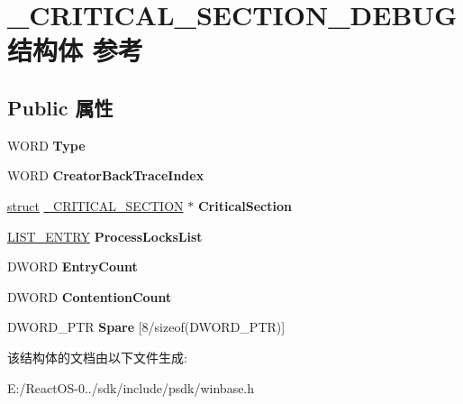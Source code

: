 \hypertarget{struct___c_r_i_t_i_c_a_l___s_e_c_t_i_o_n___d_e_b_u_g}{}\section{\+\_\+\+C\+R\+I\+T\+I\+C\+A\+L\+\_\+\+S\+E\+C\+T\+I\+O\+N\+\_\+\+D\+E\+B\+U\+G结构体 参考}
\label{struct___c_r_i_t_i_c_a_l___s_e_c_t_i_o_n___d_e_b_u_g}
\subsection*{Public 属性}
\begin{DoxyCompactItemize}
\item 
\mbox{\label{struct___c_r_i_t_i_c_a_l___s_e_c_t_i_o_n___d_e_b_u_g_a53e9609e0dec16b27fe9f44c6d459b23}} 
W\+O\+RD {\bfseries Type}
\item 
\mbox{\label{struct___c_r_i_t_i_c_a_l___s_e_c_t_i_o_n___d_e_b_u_g_a7f074c825544e5475d18945618075313}} 
W\+O\+RD {\bfseries Creator\+Back\+Trace\+Index}
\item 
\mbox{\label{struct___c_r_i_t_i_c_a_l___s_e_c_t_i_o_n___d_e_b_u_g_aaa16657ed9ce6f8bab13669af5463d73}} 
\hyperlink{interfacestruct}{struct} \hyperlink{struct___c_r_i_t_i_c_a_l___s_e_c_t_i_o_n}{\+\_\+\+C\+R\+I\+T\+I\+C\+A\+L\+\_\+\+S\+E\+C\+T\+I\+ON} $\ast$ {\bfseries Critical\+Section}
\item 
\mbox{\label{struct___c_r_i_t_i_c_a_l___s_e_c_t_i_o_n___d_e_b_u_g_ac3f8c4d5aa5c6a3505303a703b6ee796}} 
\hyperlink{struct___l_i_s_t___e_n_t_r_y}{L\+I\+S\+T\+\_\+\+E\+N\+T\+RY} {\bfseries Process\+Locks\+List}
\item 
\mbox{\label{struct___c_r_i_t_i_c_a_l___s_e_c_t_i_o_n___d_e_b_u_g_a87712bec7972da4c4e8720fd5402fd0d}} 
D\+W\+O\+RD {\bfseries Entry\+Count}
\item 
\mbox{\label{struct___c_r_i_t_i_c_a_l___s_e_c_t_i_o_n___d_e_b_u_g_a7dea1a79cc8fafce1b2f5b8ca8a9f0f7}} 
D\+W\+O\+RD {\bfseries Contention\+Count}
\item 
\mbox{\label{struct___c_r_i_t_i_c_a_l___s_e_c_t_i_o_n___d_e_b_u_g_ab5c61e89eb213a7ae501dacb74266f30}} 
D\+W\+O\+R\+D\+\_\+\+P\+TR {\bfseries Spare} \mbox{[}8/sizeof(D\+W\+O\+R\+D\+\_\+\+P\+TR)\mbox{]}
\end{DoxyCompactItemize}


该结构体的文档由以下文件生成\+:\begin{DoxyCompactItemize}
\item 
E\+:/\+React\+O\+S-\/0../sdk/include/psdk/winbase.\+h\end{DoxyCompactItemize}
